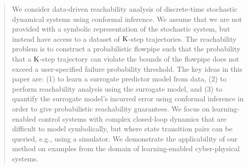 \begin{abstract}
We consider data-driven reachability analysis of
discrete-time stochastic dynamical systems using conformal inference. We assume that we are not
provided with a symbolic representation of the stochastic
system, but instead have access to a dataset of $\horizon$-step 
trajectories. The reachability problem is to construct a probabilistic flowpipe such that the probability that a $\horizon$-step trajectory can violate the bounds of the flowpipe does not exceed a user-specified failure probability threshold. The key ideas in this paper are: (1) to learn a surrogate predictor
model from data, (2) to perform reachability
analysis using the surrogate model, and (3) to quantify the surrogate model's incurred
error using conformal inference in order to give probabilistic reachability guarantees. We focus on learning-enabled control systems with complex closed-loop dynamics that are difficult to
model symbolically, but where state transition pairs can be queried, e.g., using a simulator. We demonstrate the applicability of our 
method on examples from the domain of 
learning-enabled cyber-physical systems.
\end{abstract}

